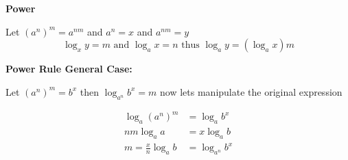 \textbf{Power}

Let \((a^n)^m = a^{nm}\) and \(a^n = x\) and \(a^{nm} = y\)
\[
\log_x y = m \text{ and } \log_a x = n \text{ thus } \log_a y = (\log_a x )m
\]
\QED

\textbf{Power Rule General Case:}

Let \((a^n)^m = b^x\) then \(\log_{a^n} b^x = m\) now lets manipulate the original expression

\begin{align*}
\log_a (a^n)^m &= \log_a b^x\\
nm \log_a a &= x \log_a b\\
m = \frac{x}{n} \log_a b &=  \log_{a^n} b^x 
\end{align*}

\QED
\newpage
